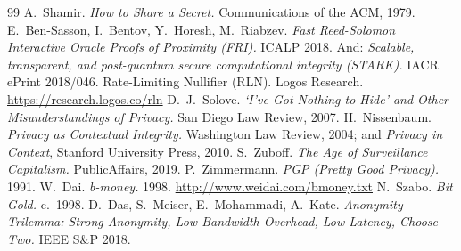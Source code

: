 \documentclass[11pt]{article}
\begin{document}
\begin{thebibliography}{99}
 A.~Shamir. \emph{How to Share a Secret.} Communications of the ACM,
1979.
 E.~Ben-Sasson, I.~Bentov, Y.~Horesh, M.~Riabzev. \emph{Fast Reed-Solomon
Interactive Oracle Proofs of Proximity (FRI).} ICALP 2018. And: \emph{Scalable,
transparent, and post-quantum secure computational integrity (STARK).} IACR ePrint
2018/046.
 Rate-Limiting Nullifier (RLN). Logos Research.
\url{https://research.logos.co/rln}
 D.~J.~Solove. \emph{`I've Got Nothing to Hide' and Other
Misunderstandings of Privacy.} San Diego Law Review, 2007.
 H.~Nissenbaum. \emph{Privacy as Contextual Integrity.} Washington
Law Review, 2004; and \emph{Privacy in Context}, Stanford University Press, 2010.
 S.~Zuboff. \emph{The Age of Surveillance Capitalism.} PublicAffairs,
2019.
 P.~Zimmermann. \emph{PGP (Pretty Good Privacy).} 1991.
 W.~Dai. \emph{b-money.} 1998. \url{http://www.weidai.com/bmoney.txt}
 N.~Szabo. \emph{Bit Gold.} c.~1998.
 D.~Das, S.~Meiser, E.~Mohammadi, A.~Kate. \emph{Anonymity Trilemma: Strong Anonymity, Low Bandwidth Overhead, Low Latency, Choose Two.} IEEE S\&P 2018.
\end{thebibliography}
\end{document}
